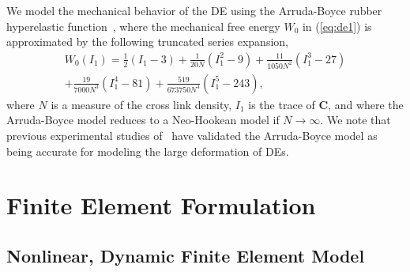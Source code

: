 \documentclass[final,authoryear,3p,times,twocolumn]{elsarticle}
\newcommand{\mbf}{\mathbf}
\begin{document}
We model the mechanical behavior of the DE using the Arruda-Boyce rubber hyperelastic function~\citep{arrudaJMPS1993}, where the mechanical free energy $W_{0}$ in (\ref{eq:de1}) is approximated by the following truncated series expansion,
\begin{eqnarray}\label{eq:de2} W_{0}(I_{1})=\frac{1}{2}(I_{1}-3)+\frac{1}{20N}(I_{1}^{2}-9)+\frac{11}{1050N^{2}}(I_{1}^{3}-27) \\ \nonumber
+\frac{19}{7000N^{3}}(I_{1}^{4}-81)+\frac{519}{673750N^{4}}(I_{1}^{5}-243),
\end{eqnarray}
where $N$ is a measure of the cross link density, $I_{1}$ is the trace of $\mbf{C}$, and where the Arruda-Boyce model reduces to a Neo-Hookean model if $N\rightarrow\infty$.  We note that previous experimental studies of~\citet{wisslerSAA2007a} have validated the Arruda-Boyce model as being accurate for modeling the large deformation of DEs.  

\section{Finite Element Formulation}
\subsection{Nonlinear, Dynamic Finite Element Model}
\end{document}

